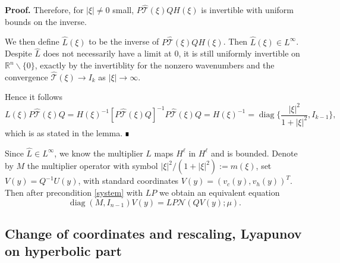 \documentclass[letterpaper,11pt]{article}
\newcommand{\R}{\mathbb{R}}
\newcommand{\rmO}{\mathcal{O}}
\newcommand{\eps}{\varepsilon}
\newcommand{\Nl}{\mathcal{N}}
\newcommand{\That}{\widehat{\mathcal{T}}}
\newcommand{\diag}{\operatorname{diag}}
\numberwithin{equation}{section}
\theoremstyle{plain}
\theoremstyle{remark}
\newenvironment{Proof}[1][.]%
 {\begin{trivlist}\item[]\textbf{Proof#1 }}%
 {\hspace*{\fill}$\rule{0.3\baselineskip}{0.35\baselineskip}$\end{trivlist}}
\begin{document}
\begin{Proof}
Therefore, for $|\xi|\neq 0$ small, $P\That(\xi)QH(\xi)$ is invertible with uniform bounds on the inverse.

 We then define $\widehat{L}(\xi)$ to be the inverse of $P\That(\xi)QH(\xi)$. Then $\widehat{L} (\xi) \in L^\infty$. Despite $\widehat{L}$ does not necessarily have a limit at $0$, it is still uniformly invertible on $\R^n\backslash\{0\}$, exactly by the invertiblity for the nonzero wavenumbers and the convergence $\That(\xi) \to I_k$ as $|\xi|\to \infty$.
 
 Hence it follows
 \[
 L(\xi)P\That(\xi)Q = H(\xi)^{-1}[P\That(\xi)Q]^{-1}P\That(\xi)Q = H(\xi)^{-1}=\diag\{\dfrac{|\xi|^2}{1+|\xi|^2},I_{k-1}\},
 \]
 which is as stated in the lemma. 
 \end{Proof}
 
 
 Since $\widehat{L} \in L^\infty$, we know the multiplier $L$ maps $H^\ell$ in $H^\ell$ and is bounded. Denote by $M$ the multiplier operator with symbol $|\xi|^2/(1+|\xi|^2):= m(\xi)$, set $V(y)=Q^{-1}U(y)$, with standard coordinates $V(y)=(v_c(y),v_h(y))^T$. Then after precondition \eqref{system} with $LP$ we obtain an equivalent equation
\begin{equation}\label{TranEq}
\diag(M, I_{n-1})V(y)=LP\Nl(QV(y);\mu).
\end{equation}


\subsection{Change of coordinates and rescaling, Lyapunov on hyperbolic part }
\iffalse
\[
\mu=\frac{1}{\alpha}\tilde{\mu}, \hspace{0.1in} v_c(\cdot)=\frac{-1}{\beta}\tilde{\mu}\tilde{v}_c(\sqrt{\tilde{\mu}} \cdot), \hspace{0.1in} v_h(\cdot)=\tilde{\mu} \tilde{v}_h(\sqrt{\tilde{\mu}} \cdot),
\] and we shall write $\eps := \sqrt{\tilde{\mu}}$.

We then solve the equation in the hyperbolic part and get $\tilde{v}_h = \psi(\tilde{v}_c,\eps) = \rmO(\eps^2)=\rmO(\mu)$, this means $v_h$ is $\rmO(\mu^2)$.
\fi
\end{document}
